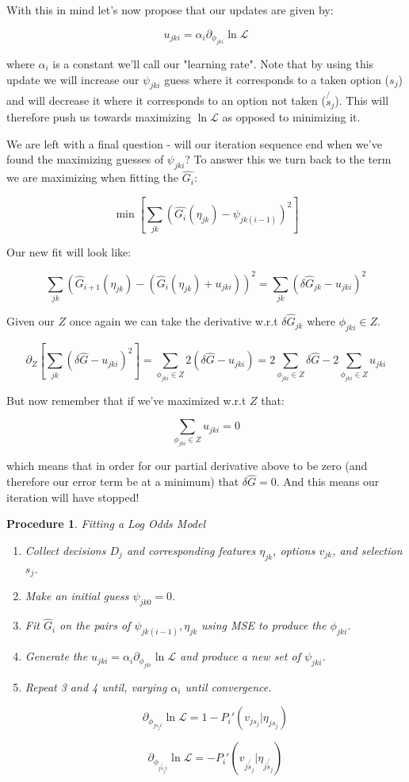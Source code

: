\documentclass[11pt]{article}
\newtheorem{procedure}{Procedure}
\begin{document}
With this in mind let's now propose that our updates are given by:

$$u_{jki} = \alpha_i \partial_{\phi_{jki}} \ln{\mathcal{L}} $$

where $\alpha_i$ is a constant we'll call our "learning rate". Note that by using this update we will increase our $\psi_{jki}$ guess where it corresponds to a taken option ($s_j$) and will decrease it where it corresponds to an option not taken ($\not{s_j}$). This will therefore push us towards maximizing $\ln{\mathcal{L}}$ as opposed to minimizing it. \newline

We are left with a final question - will our iteration sequence end when we've found the maximizing guesses of $\psi_{jki}$? To answer this we turn back to the term we are maximizing when fitting the $\hat{G_i}$: 

$$\min{\left[ \sum_{jk}\left(\hat{G_i}(\eta_{jk}) - \psi_{jk(i-1)}\right)^2 \right]}$$

Our new fit will look like:

$$\sum_{jk}\left(\hat{G}_{i+1}(\eta_{jk}) - (\hat{G}_i(\eta_{jk}) + u_{jki})\right)^2=\sum_{jk}\left( \delta \hat{G}_{jk} - u_{jki}\right)^2$$

Given our $Z$ once again we can take the derivative w.r.t $\delta \hat{G}_{jk}$ where $\phi_{jki} \in Z$. 

$$\partial_Z \left[ \sum_{jk}\left( \delta \hat{G} - u_{jki}\right)^2 \right] = \sum_{\phi_{jki} \in Z} 2\left( \delta \hat{G} - u_{jki}\right) = 2\sum_{\phi_{jki} \in Z} \delta \hat{G} - 2\sum_{\phi_{jki} \in Z} u_{jki}$$

But now remember that if we've maximized w.r.t $Z$ that:

$$\sum_{\phi_{jki} \in Z} u_{jki} = 0$$

which means that in order for our partial derivative above to be zero (and therefore our error term be at a minimum) that $\delta \hat{G}=0$. And this means our iteration will have stopped! 

\newpage

\begin{procedure}{Fitting a Log Odds Model}
\begin{enumerate}
\item Collect decisions $D_j$ and corresponding features $\eta_{jk}$, options $v_{jk}$, and selection $s_j$. 
\item Make an initial guess $\psi_{jk0} = 0$.
\item Fit $\hat{G}_i$ on the pairs of $\psi_{jk(i-1)},\eta_{jk}$ using MSE to produce the $\phi_{jki}$.
\item Generate the $u_{jki} = \alpha_i \partial_{\phi_{jki}} \ln{\mathcal{L}}$ and produce a new set of $\psi_{jki}$.
\item Repeat 3 and 4 until, varying $\alpha_i$ until convergence. 

$$\partial_{\phi_{js_ji}}\ln{\mathcal{L}}=1-P_i'(v_{js_j} | \eta_{js_j})$$ 

$$\partial_{\phi_{j\not{s_j}i}}\ln{\mathcal{L}}=-P_i'(v_{j\not{s_j}} | \eta_{j\not{s_j}})$$ 
\end{enumerate}

\end{procedure}
\end{document}
